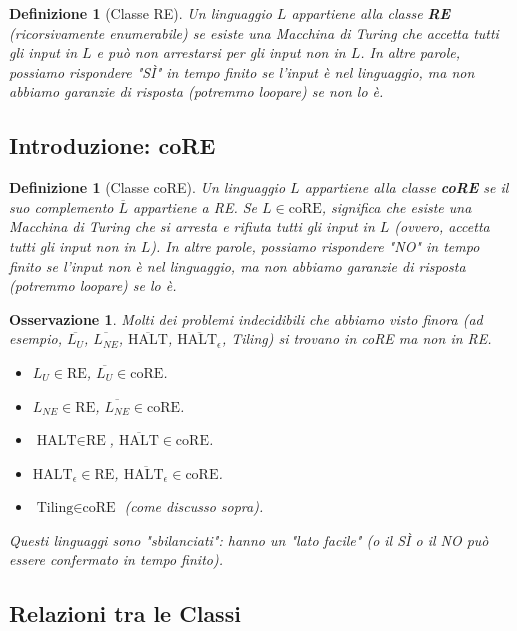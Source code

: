 \documentclass[a4paper, 11pt]{book} %
\newtheorem{definition}[theorem]{Definizione}
\newtheorem{remark}[theorem]{Osservazione}
\theoremstyle{definition}
\begin{document}
\begin{definition}[Classe RE]
Un linguaggio $L$ appartiene alla classe \textbf{RE} (ricorsivamente enumerabile) se esiste una Macchina di Turing che accetta tutti gli input in $L$ e può non arrestarsi per gli input non in $L$. In altre parole, possiamo rispondere "SÌ" in tempo finito se l'input è nel linguaggio, ma non abbiamo garanzie di risposta (potremmo loopare) se non lo è.
\end{definition}

\subsection{Introduzione: coRE}
\begin{definition}[Classe coRE]
Un linguaggio $L$ appartiene alla classe \textbf{coRE} se il suo complemento $\overline{L}$ appartiene a RE.
Se $L \in \text{coRE}$, significa che esiste una Macchina di Turing che si arresta e rifiuta tutti gli input in $L$ (ovvero, accetta tutti gli input non in $L$). In altre parole, possiamo rispondere "NO" in tempo finito se l'input non è nel linguaggio, ma non abbiamo garanzie di risposta (potremmo loopare) se lo è.
\end{definition}

\begin{remark}
Molti dei problemi indecidibili che abbiamo visto finora (ad esempio, $\overline{L_U}$, $\overline{L_{NE}}$, $\overline{\text{HALT}}$, $\overline{\text{HALT}_\epsilon}$, Tiling) si trovano in coRE ma non in RE.
\begin{itemize}
    \item $L_U \in \text{RE}$, $\overline{L_U} \in \text{coRE}$.
    \item $L_{NE} \in \text{RE}$, $\overline{L_{NE}} \in \text{coRE}$.
    \item $\text{HALT} \in \text{RE}$, $\overline{\text{HALT}} \in \text{coRE}$.
    \item $\text{HALT}_\epsilon \in \text{RE}$, $\overline{\text{HALT}_\epsilon} \in \text{coRE}$.
    \item $\text{Tiling} \in \text{coRE}$ (come discusso sopra).
\end{itemize}
Questi linguaggi sono "sbilanciati": hanno un "lato facile" (o il SÌ o il NO può essere confermato in tempo finito).
\end{remark}

\subsection{Relazioni tra le Classi}
\end{document}
